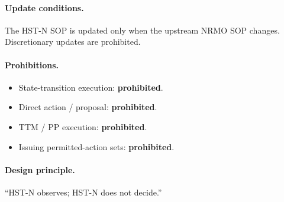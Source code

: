 \paragraph{Update conditions.}
The HST-N SOP is updated only when the upstream NRMO SOP changes.
Discretionary updates are prohibited.

\paragraph{Prohibitions.}

\begin{itemize}
\item State-transition execution: \textbf{prohibited}.
\item Direct action / proposal: \textbf{prohibited}.
\item TTM / PP execution: \textbf{prohibited}.
\item Issuing permitted-action sets: \textbf{prohibited}.
\end{itemize}

\paragraph{Design principle.}
``HST-N observes; HST-N does not decide.''

